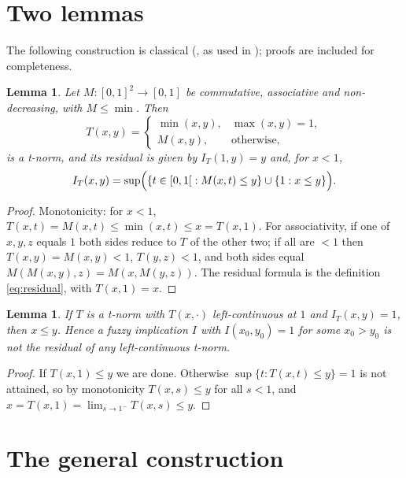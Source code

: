 \documentclass[11pt]{amsart}
\numberwithin{equation}{section}
\newtheorem{lemma}[theorem]{Lemma}
\theoremstyle{definition}
\theoremstyle{remark}
\newcommand{\Ioc}{[0,1[}
\begin{document}
\section{Two lemmas}\label{sec:lemmas}

The following construction is classical (\cite[Corollary~1.8]{KMP}, as used in
\cite[\S4, (5)--(6)]{JBM2011}); proofs are included for completeness.

\begin{lemma}\label{lem:drastic}
Let $M\colon[0,1]^2\to[0,1]$ be commutative, associative and non-decreasing,
with $M\le\min$. Then
\begin{equation}\label{eq:TM-closure}
  T(x,y)=\begin{cases} \min(x,y), & \max(x,y)=1,\\ M(x,y), & \text{otherwise},\end{cases}
\end{equation}
is a t-norm, and its residual is given by $I_T(1,y)=y$ and, for $x<1$,
\begin{equation}\label{eq:IT-closure}
  I_T(x,y)=\sup\Bigl(\{t\in\Ioc\; : M(x,t)\le y\}\cup\{1 : x\le y\}\Bigr).
\end{equation}
\end{lemma}

\begin{proof}
Monotonicity: for $x<1$, $T(x,t)=M(x,t)\le\min(x,t)\le x=T(x,1)$. For
associativity, if one of $x,y,z$ equals $1$ both sides reduce to $T$ of the
other two; if all are $<1$ then $T(x,y)=M(x,y)<1$, $T(y,z)<1$, and both sides
equal $M(M(x,y),z)=M(x,M(y,z))$. The residual formula is the definition
\eqref{eq:residual}, with $T(x,1)=x$.
\end{proof}

\begin{lemma}\label{lem:lc}
If $T$ is a t-norm with $T(x,\cdot)$ left-continuous at $1$ and
$I_T(x,y)=1$, then $x\le y$. Hence a fuzzy implication $I$ with
$I(x_0,y_0)=1$ for some $x_0>y_0$ is not the residual of any left-continuous
t-norm.
\end{lemma}

\begin{proof}
If $T(x,1)\le y$ we are done. Otherwise $\sup\{t:T(x,t)\le y\}=1$ is not
attained, so by monotonicity $T(x,s)\le y$ for all $s<1$, and
$x=T(x,1)=\lim_{s\to1^-}T(x,s)\le y$.
\end{proof}

\section{The general construction}\label{sec:general}
\end{document}
